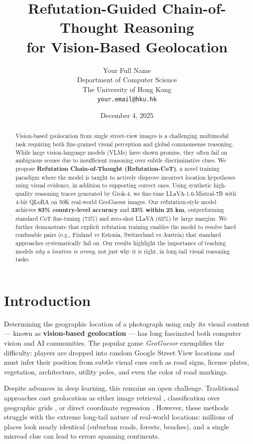 \documentclass[11pt,a4paper]{article}
\title{\textbf{Refutation-Guided Chain-of-Thought Reasoning\\ for Vision-Based Geolocation}}
\author{
    Your Full Name \\
    Department of Computer Science \\
    The University of Hong Kong \\
    \texttt{your.email@hku.hk}
}
\date{December 4, 2025}
\begin{document}
\maketitle

\begin{abstract}
Vision-based geolocation from single street-view images is a challenging multimodal task requiring both fine-grained visual perception and global commonsense reasoning. While large vision-language models (VLMs) have shown promise, they often fail on ambiguous scenes due to insufficient reasoning over subtle discriminative clues. We propose \textbf{Refutation Chain-of-Thought (Refutation-CoT)}, a novel training paradigm where the model is taught to actively disprove incorrect location hypotheses using visual evidence, in addition to supporting correct ones. Using synthetic high-quality reasoning traces generated by Grok-4, we fine-tune LLaVA-1.6-Mistral-7B with 4-bit QLoRA on 50K real-world GeoGuessr images. Our refutation-style model achieves \textbf{83\% country-level accuracy} and \textbf{33\% within 25 km}, outperforming standard CoT fine-tuning (73\%) and zero-shot LLaVA (62\%) by large margins. We further demonstrate that explicit refutation training enables the model to resolve hard confusable pairs (e.g., Finland vs Estonia, Switzerland vs Austria) that standard approaches systematically fail on. Our results highlight the importance of teaching models \emph{why a location is wrong}, not just why it is right, in long-tail visual reasoning tasks.
\end{abstract}

\section{Introduction}
Determining the geographic location of a photograph using only its visual content — known as \textbf{vision-based geolocation} — has long fascinated both computer vision and AI communities. The popular game \textit{GeoGuessr} exemplifies the difficulty: players are dropped into random Google Street View locations and must infer their position from subtle visual cues such as road signs, license plates, vegetation, architecture, utility poles, and even the color of road markings.

Despite advances in deep learning, this remains an open challenge. Traditional approaches cast geolocation as either image retrieval \cite{vo2017revisiting, shi2022beyond}, classification over geographic grids \cite{weyand2016planet, muller2023partitioned}, or direct coordinate regression \cite{luo2023geocapsnet}. However, these methods struggle with the extreme long-tail nature of real-world locations: millions of places look nearly identical (suburban roads, forests, beaches), and a single misread clue can lead to errors spanning continents.
\end{document}
